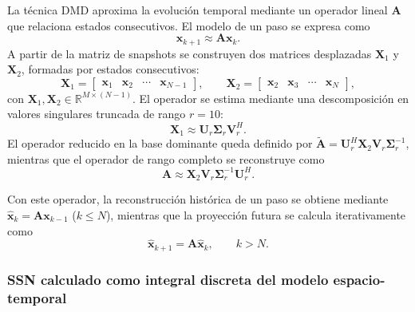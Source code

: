 La técnica DMD aproxima la evolución temporal mediante un operador lineal $\mathbf{A}$ que relaciona estados consecutivos. El modelo de un paso se expresa como
\begin{equation}
\mathbf{x}_{k+1}\approx\mathbf{A}\mathbf{x}_{k}.
\end{equation}
A partir de la matriz de snapshots se construyen dos matrices desplazadas
$\mathbf{X}_1$ y $\mathbf{X}_2$, formadas por estados consecutivos:
\begin{equation}
\mathbf{X}_1=\begin{bmatrix}
\mathbf{x}_1 & \mathbf{x}_2 & \cdots & \mathbf{x}_{N-1}
\end{bmatrix},
\qquad
\mathbf{X}_2=\begin{bmatrix}
\mathbf{x}_2 & \mathbf{x}_3 & \cdots & \mathbf{x}_{N}
\end{bmatrix},
\end{equation}
con $\mathbf{X}_1,\mathbf{X}_2\in\mathbb{R}^{M\times(N-1)}$. El operador se
estima mediante una descomposición en valores singulares truncada de rango
$r=10$:
\begin{equation}
\mathbf{X}_1\approx\mathbf{U}_r\boldsymbol{\Sigma}_r\mathbf{V}_r^{H}.
\end{equation}
El operador reducido en la base dominante queda definido por $\tilde{\mathbf{A}}=\mathbf{U}_r^{H}\mathbf{X}_2\mathbf{V}_r\boldsymbol{\Sigma}_r^{-1}$, mientras que el operador de rango completo se reconstruye como
\begin{equation}
\mathbf{A}\approx\mathbf{X}_2\mathbf{V}_r\boldsymbol{\Sigma}_r^{-1}\mathbf{U}_r^{H}.
\end{equation}

Con este operador, la reconstrucción histórica de un paso se obtiene mediante $\widehat{\mathbf{x}}_{k}=\mathbf{A}\mathbf{x}_{k-1}$ ($k\leq N$), mientras que la proyección futura se calcula iterativamente como
\begin{equation}
\widehat{\mathbf{x}}_{k+1}=\mathbf{A}\widehat{\mathbf{x}}_{k}, \qquad k>N.
\end{equation}

\subsubsection{SSN calculado como integral discreta del modelo espacio-temporal}

